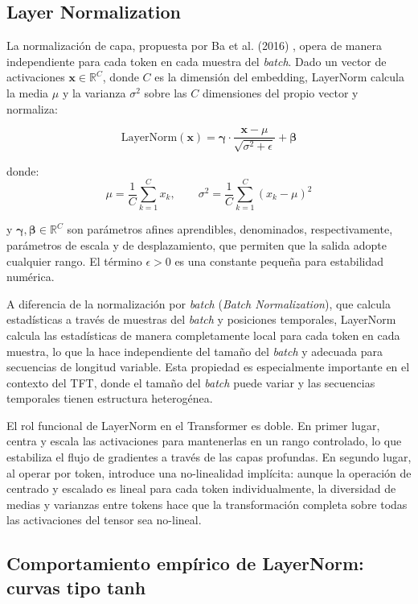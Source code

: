 \subsection{Layer Normalization}
 
La normalización de capa, propuesta por Ba et al. (2016) \cite{LNBa}, opera de manera independiente para cada token en cada muestra del \textit{batch}. Dado un vector de activaciones $\mathbf{x} \in \mathbb{R}^C$, donde $C$ es la dimensión del embedding, LayerNorm calcula la media $\mu$ y la varianza $\sigma^2$ sobre las $C$ dimensiones del propio vector y normaliza:
 
\begin{equation}
\text{LayerNorm}(\mathbf{x}) = \boldsymbol{\gamma} \cdot \frac{\mathbf{x} - \mu}{\sqrt{\sigma^2 + \epsilon}} + \boldsymbol{\beta}
\end{equation}
 
donde:
$$\mu = \frac{1}{C}\sum_{k=1}^{C} x_k, \qquad \sigma^2 = \frac{1}{C}\sum_{k=1}^{C}(x_k - \mu)^2
$$
 
y $\boldsymbol{\gamma}, \boldsymbol{\beta} \in \mathbb{R}^C$ son parámetros afines aprendibles, denominados, respectivamente, parámetros de escala y de desplazamiento, que permiten que la salida adopte cualquier rango. El término $\epsilon > 0$ es una constante pequeña para estabilidad numérica.
 
A diferencia de la normalización por \textit{batch} (\textit{Batch Normalization}), que calcula estadísticas a través de muestras del \textit{batch} y posiciones temporales, LayerNorm calcula las estadísticas de manera completamente local para cada token en cada muestra, lo que la hace independiente del tamaño del \textit{batch} y adecuada para secuencias de longitud variable. Esta propiedad es especialmente importante en el contexto del TFT, donde el tamaño del \textit{batch} puede variar y las secuencias temporales tienen estructura heterogénea.
 
El rol funcional de LayerNorm en el Transformer es doble. En primer lugar, centra y escala las activaciones para mantenerlas en un rango controlado, lo que estabiliza el flujo de gradientes a través de las capas profundas. En segundo lugar, al operar por token, introduce una no-linealidad implícita: aunque la operación de centrado y escalado es lineal para cada token individualmente, la diversidad de medias y varianzas entre tokens hace que la transformación completa sobre todas las activaciones del tensor sea no-lineal.
 
\subsection{Comportamiento empírico de LayerNorm: curvas tipo tanh}
 
